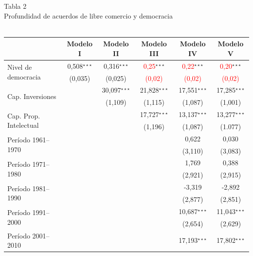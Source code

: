 \documentclass[a4paper]{tufte-handout}
\begin{document}
\begin{table}[h]
  \centering
  \selectfont
   \smallskip\noindent\small Tabla 2 \\ Profundidad de acuerdos de libre comercio y democracia \\~\\
  \begin{tabular}{l c c c c c}
    \toprule
     & Modelo I & Modelo II & Modelo III & Modelo IV & Modelo V \\ \midrule
    \multirow{2}{*}{Nivel de democracia} & 0,508$^{\star\star\star}$ & 0,316$^{\star\star\star}$  & \textcolor{red}{0,25}$^{\star\star\star}$  & \textcolor{red}{0,22}$^{\star\star\star}$  & \textcolor{red}{0,20}$^{\star\star\star}$ \\
    & {\scriptsize (0,035)} & {\scriptsize (0,025)} & {\scriptsize \textcolor{red}{(0,02)}} & {\scriptsize \textcolor{red}{(0,02)}} & {\scriptsize \textcolor{red}{(0,02)}} \\ 
    \multirow{2}{*}{Cap. Inversiones} & & 30,097$^{\star\star\star}$ & 21,828$^{\star\star\star}$ & 17,551$^{\star\star\star}$ & 17,285$^{\star\star\star}$ \\
    & & {\scriptsize (1,109)} & {\scriptsize (1,115)} & {\scriptsize (1,087)} & {\scriptsize (1,001)} \\
    \multirow{2}{*}{Cap. Prop. Intelectual} & & & 17,727$^{\star\star\star}$ & 13,137$^{\star\star\star}$ & 13,277$^{\star\star\star}$ \\
    & & & {\scriptsize (1,196)} & {\scriptsize (1,087)} & {\scriptsize (1.077)} \\
    \multirow{2}{*}{Período 1961--1970} & & & & 0,622  & 0,030 \\
    & & & & {\scriptsize (3,110)} & {\scriptsize (3,083)} \\
    \multirow{2}{*}{Período 1971--1980} & & & & 1,769 & 0,388 \\
    & & & & {\scriptsize (2,921)} & {\scriptsize (2,915)} \\
    \multirow{2}{*}{Período  1981--1990} & & & & -3,319 & -2,892 \\
    & & & & {\scriptsize (2,877)} & {\scriptsize (2,851)} \\
    \multirow{2}{*}{Período 1991--2000} & & & & 10,687$^{\star\star\star}$ & 11,043$^{\star\star\star}$ \\
    & & & & {\scriptsize (2,654)} & {\scriptsize (2,629)} \\ 
    \multirow{2}{*}{Período  2001--2010} & & & & 17,193$^{\star\star\star}$ & 17,802$^{\star\star\star}$ \\

\end{tabular}
\end{table}
\end{document}
